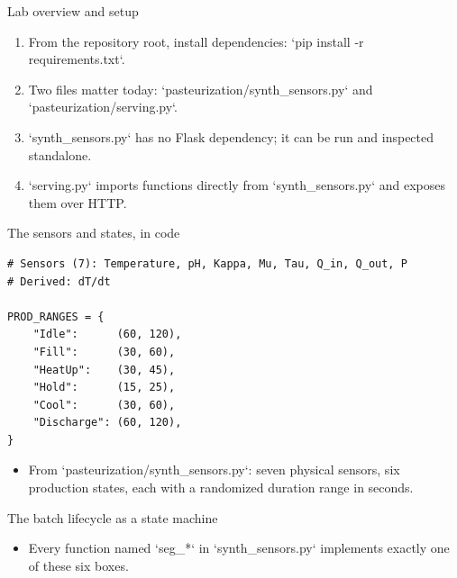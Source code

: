 \begin{frame}{Lab overview and setup}
\begin{enumerate}
\item From the repository root, install dependencies: `pip install -r requirements.txt`.
\item Two files matter today: `pasteurization/synth_sensors.py` and `pasteurization/serving.py`.
\item `synth_sensors.py` has no Flask dependency; it can be run and inspected standalone.
\item `serving.py` imports functions directly from `synth_sensors.py` and exposes them over HTTP.
\end{enumerate}
\coursefooter
\end{frame}

\begin{frame}[fragile]{The sensors and states, in code}
\begin{lstlisting}[style=coursepython]
# Sensors (7): Temperature, pH, Kappa, Mu, Tau, Q_in, Q_out, P
# Derived: dT/dt

PROD_RANGES = {
    "Idle":      (60, 120),
    "Fill":      (30, 60),
    "HeatUp":    (30, 45),
    "Hold":      (15, 25),
    "Cool":      (30, 60),
    "Discharge": (60, 120),
}
\end{lstlisting}
\begin{itemize}
\item From `pasteurization/synth_sensors.py`: seven physical sensors, six production states, each with a randomized duration range in seconds.
\end{itemize}
\coursefooter
\end{frame}

\begin{frame}{The batch lifecycle as a state machine}
\centering
{}
\vspace{0.4em}
\begin{itemize}
\item Every function named `seg\_*` in `synth_sensors.py` implements exactly one of these six boxes.
\end{itemize}
\coursefooter
\end{frame}

